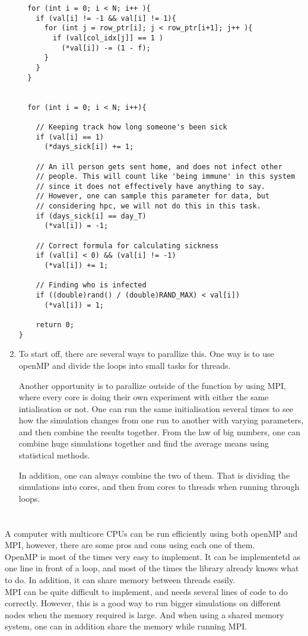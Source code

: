 \documentclass{article}
\begin{document}
\begin{enumerate}[label=(\alph*)]
\begin{lstlisting}
  for (int i = 0; i < N; i++ ){
    if (val[i] != -1 && val[i] != 1){
      for (int j = row_ptr[i]; j < row_ptr[i+1]; j++ ){
        if (val[col_idx[j]] == 1 )
          (*val[i]) -= (1 - f);
      }
    }
  }


  for (int i = 0; i < N; i++){

    // Keeping track how long someone's been sick
    if (val[i] == 1)
      (*days_sick[i]) += 1;

    // An ill person gets sent home, and does not infect other
    // people. This will count like 'being immune' in this system
    // since it does not effectively have anything to say.
    // However, one can sample this parameter for data, but
    // considering hpc, we will not do this in this task.
    if (days_sick[i] == day_T)
      (*val[i]) = -1;

    // Correct formula for calculating sickness
    if (val[i] < 0) && (val[i] != -1)
      (*val[i]) += 1;

    // Finding who is infected
    if ((double)rand() / (double)RAND_MAX) < val[i])
      (*val[i]) = 1;

    return 0;
}
\end{lstlisting}


\item
To start off, there are several ways to parallize this. One way is to use openMP and divide the loops into small tasks for threads.

Another opportunity is to parallize outside of the function by using MPI, where every core is doing their own experiment with either the same intialisation or not. One can run the same initialisation several times to see how the simulation changes from one run to another with varying parameters, and then combine the results together. From the law of big numbers, one can combine huge simulations together and find the average means using statistical methods.

In addition, one can always combine the two of them. That is dividing the simulations into cores, and then from cores to threads when running through loops.

\end{enumerate}

\section{}
A computer with multicore CPUs can be run efficiently using both openMP and MPI, however, there are some pros and cons using each one of them. \\

OpenMP is most of the times very easy to implement. It can be implementetd as one line in front of a loop, and most of the times the library already knows what to do. In addition, it can share memory between threads easily.\\

MPI can be quite difficult to implement, and needs several lines of code to do correctly. However, this is a good way to run bigger simulations on different nodes when the memory required is large. And when using a shared memory system, one can in addition share the memory while running MPI.
\end{document}
